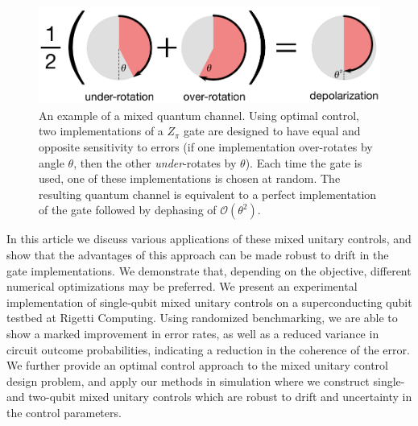 \documentclass[aps,nofootinbib,pra,notitlepage,twocolumn]{revtex4-1}
\newcommand{\order}[1]{\mathcal{O}\left( #1 \right)}
\begin{document}
\begin{figure}[t]
  \centering
  \includegraphics[width=\columnwidth]{simple_example.pdf}
  \caption{An example of a mixed quantum channel. Using optimal control, two implementations of a $Z_\pi$ gate are designed to have equal and opposite sensitivity to errors (if one implementation over-rotates by angle $\theta$, then the other \emph{under}-rotates by $\theta$). Each time the gate is used, one of these implementations is chosen at random. The resulting quantum channel is equivalent to a perfect implementation of the gate followed by dephasing of $\order{\theta^2}$.}
  \label{fig:simple_example}
\end{figure}


In this article we discuss various applications of these mixed unitary controls, and show that the advantages of this approach can be made robust to drift in the gate implementations. We demonstrate that, depending on the objective, different numerical optimizations may be preferred. We present an experimental implementation of single-qubit mixed unitary controls on a superconducting qubit testbed at Rigetti Computing. Using randomized benchmarking, we are able to show a marked improvement in error rates, as well as a reduced variance in circuit outcome probabilities, indicating a reduction in the coherence of the error. We further provide an optimal control approach to the mixed unitary control design problem, and apply our methods in simulation where we construct single- and two-qubit mixed unitary controls which are robust to drift and uncertainty in the control parameters.   

\end{document}

